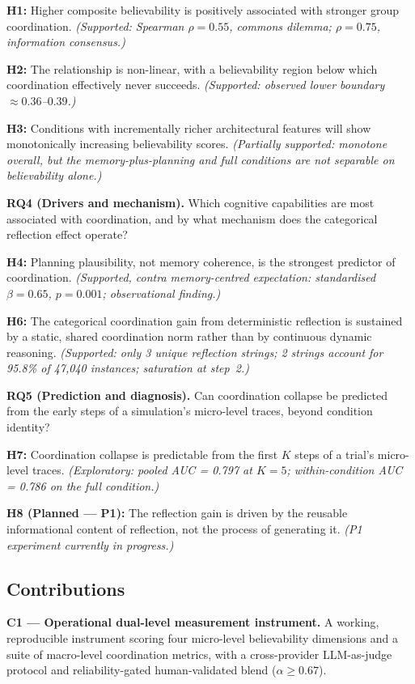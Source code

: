 \documentclass[11pt]{article}
\begin{document}
\textbf{H1:} Higher composite believability is positively associated with stronger group coordination. \emph{(Supported: Spearman $\rho = 0.55$, commons dilemma; $\rho = 0.75$, information consensus.)}

\textbf{H2:} The relationship is non-linear, with a believability region below which coordination effectively never succeeds. \emph{(Supported: observed lower boundary $\approx 0.36$--$0.39$.)}

\textbf{H3:} Conditions with incrementally richer architectural features will show monotonically increasing believability scores. \emph{(Partially supported: monotone overall, but the memory-plus-planning and full conditions are not separable on believability alone.)}

\textbf{RQ4 (Drivers and mechanism).} Which cognitive capabilities are most associated with coordination, and by what mechanism does the categorical reflection effect operate?

\textbf{H4:} Planning plausibility, not memory coherence, is the strongest predictor of coordination. \emph{(Supported, contra memory-centred expectation: standardised $\beta = 0.65$, $p = 0.001$; observational finding.)}

\textbf{H6:} The categorical coordination gain from deterministic reflection is sustained by a static, shared coordination norm rather than by continuous dynamic reasoning. \emph{(Supported: only 3 unique reflection strings; 2 strings account for 95.8\% of 47,040 instances; saturation at step~2.)}

\textbf{RQ5 (Prediction and diagnosis).} Can coordination collapse be predicted from the early steps of a simulation's micro-level traces, beyond condition identity?

\textbf{H7:} Coordination collapse is predictable from the first $K$ steps of a trial's micro-level traces. \emph{(Exploratory: pooled AUC = 0.797 at $K = 5$; within-condition AUC = 0.786 on the full condition.)}

\textbf{H8 (Planned --- P1):} The reflection gain is driven by the reusable informational content of reflection, not the process of generating it. \emph{(P1 experiment currently in progress.)}

\subsection{Contributions}

\textbf{C1 --- Operational dual-level measurement instrument.} A working, reproducible instrument scoring four micro-level believability dimensions and a suite of macro-level coordination metrics, with a cross-provider LLM-as-judge protocol \cite{zheng2023judging} and reliability-gated human-validated blend ($\alpha \geq 0.67$).
\end{document}

